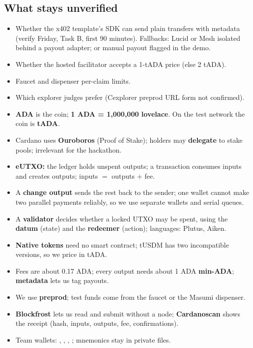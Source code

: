 \subsection{What stays unverified}
\begin{itemize}
  \item Whether the x402 template's SDK can send plain transfers with metadata (verify Friday, Task B, first 90 minutes). Fallbacks: Lucid or Mesh isolated behind a payout adapter; or manual payout flagged in the demo.
  \item Whether the hosted facilitator accepts a 1-tADA price (else 2 tADA).
  \item Faucet and dispenser per-claim limits.
  \item Which explorer judges prefer (Cexplorer preprod URL form not confirmed).
\end{itemize}

\begin{keypoints}
\begin{itemize}
  \item \textbf{ADA} is the coin; \textbf{1 ADA = 1{,}000{,}000 lovelace}. On the test network the coin is \textbf{tADA}.
  \item Cardano uses \textbf{Ouroboros} (Proof of Stake); holders may \textbf{delegate} to stake pools; irrelevant for the hackathon.
  \item \textbf{eUTXO:} the ledger holds unspent outputs; a transaction consumes inputs and creates outputs; inputs $=$ outputs $+$ fee.
  \item A \textbf{change output} sends the rest back to the sender; one wallet cannot make two parallel payments reliably, so we use separate wallets and serial queues.
  \item A \textbf{validator} decides whether a locked UTXO may be spent, using the \textbf{datum} (state) and the \textbf{redeemer} (action); languages: Plutus, Aiken.
  \item \textbf{Native tokens} need no smart contract; tUSDM has two incompatible versions, so we price in tADA.
  \item Fees are about 0.17 ADA; every output needs about 1 ADA \textbf{min-ADA}; \textbf{metadata} lets us tag payouts.
  \item We use \textbf{preprod}; test funds come from the faucet or the Masumi dispenser.
  \item \textbf{Blockfrost} lets us read and submit without a node; \textbf{Cardanoscan} shows the receipt (hash, inputs, outputs, fee, confirmations).
  \item Team wallets: , , , ; mnemonics stay in private  files.
\end{itemize}
\end{keypoints}

